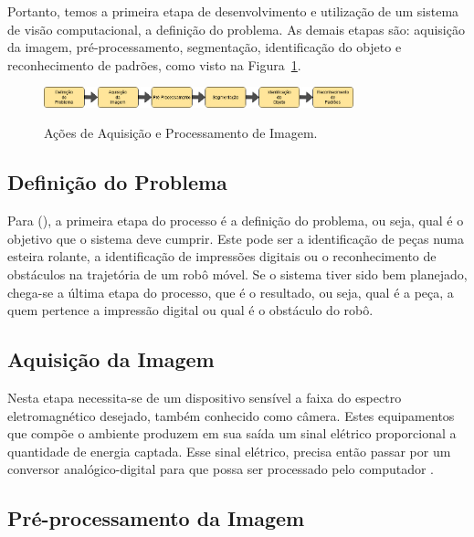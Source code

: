 Portanto, temos a primeira etapa de desenvolvimento e utilização de um sistema de visão computacional, a definição do problema. As demais etapas são: aquisição da imagem, pré-processamento, segmentação, identificação do objeto e reconhecimento de padrões, como visto na Figura~\ref{fig:acoesProcImagem}.

\begin{figure}[!hbtp]
  \centering
   \caption{Ações de Aquisição e Processamento de Imagem.}
    \includegraphics[width = 0.8\textwidth]{Caps/Figs/ref-teorico/acoes-procImagem.jpg}
   \label{fig:acoesProcImagem}
\end{figure}

\subsection{Definição do Problema}
\label{subsec:defProblema}

Para \citeauthor{rogeralex1999} (\citeyear{rogeralex1999}), a primeira etapa do processo é a definição do problema, ou seja, qual é o objetivo que o sistema deve cumprir. Este pode ser a identificação de peças numa esteira rolante, a identificação de impressões digitais ou o reconhecimento de obstáculos na trajetória de um robô móvel. Se o sistema tiver sido bem planejado, chega-se a última etapa do processo, que é o resultado, ou seja, qual é a peça, a quem pertence a impressão digital ou qual é o obstáculo do robô.

\subsection{Aquisição da Imagem}
\label{subsec:aquisImagem}

Nesta etapa necessita-se de um dispositivo sensível a faixa do espectro eletromagnético desejado, também conhecido como câmera. Estes equipamentos que compõe o ambiente produzem em sua saída um sinal elétrico proporcional a quantidade de energia captada. Esse sinal elétrico, precisa então passar por um conversor analógico-digital para que possa ser processado pelo computador \cite{rogeralex1999}.

\subsection{Pré-processamento da Imagem}
\label{subsec:preProcImagem}


